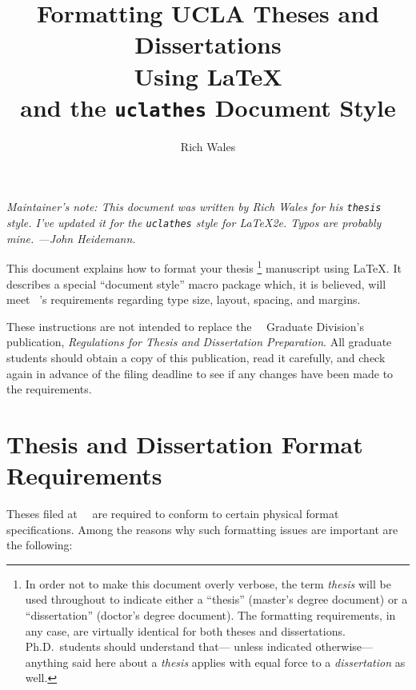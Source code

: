 \documentclass {article}
\title	{ Formatting UCLA Theses and Dissertations \\
	 Using \LaTeX \\
	 and the \texttt{uclathes} Document Style}
\author {Rich Wales}
\date{}
\newcommand {\caps}[1] {\mbox {\ifnum\fam=0 \scshape\else\uppercase\fi{#1}}}
\newcommand {\regs} {{\sl Regulations for Thesis
		      and Dissertation Preparation}}
\newcommand {\ucla} {\caps {ucla}}
\begin{document}
\maketitle

\newcommand{\MaintainNote}[1]{{\slshape Maintainer's note:  #1}}

\MaintainNote{
  This document was written by Rich Wales for his \texttt{thesis} style.
  I've updated it for the \texttt{uclathes} style for \LaTeX 2e.
  Typos are probably mine.
   ---John Heidemann.}


This document explains how to format your thesis%
\footnote {In order not to make this document overly verbose,
the term {\em thesis\/} will be used throughout
to indicate either a ``thesis'' (master's degree document)
or a ``dissertation'' (doctor's degree document).
The formatting requirements, in any case,
are virtually identical for both theses and dissertations.
Ph.D.\ students should understand that---%
unless indicated otherwise---%
anything said here about a {\em thesis\/}
applies with equal force to a {\em dissertation\/} as well.}
manuscript using \LaTeX.
It describes a special ``document style'' macro package
which, it is believed, will meet \ucla's requirements
regarding type size, layout, spacing, and margins.

These instructions are not intended to replace
the \ucla\ Graduate Division's publication, \regs.
All graduate students should obtain a copy of this publication,
read it carefully, and check again in advance
of the filing deadline to see if any changes have been made
to the requirements.


\section {Thesis and Dissertation Format Requirements}

Theses filed at \ucla\ are required to conform
to certain physical format specifications.
Among the reasons why such formatting issues are important
are the following:
\end{document}
